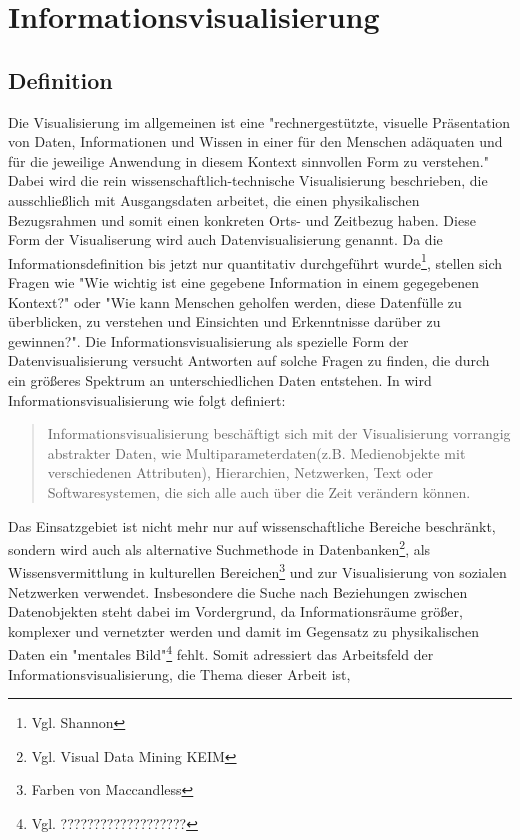 \documentclass[a4paper, 12pt, onepage, pdftex, headsepline, footsepline]{scrreprt}
\begin{document}
\chapter{Informationsvisualisierung}

\section{Definition}
Die Visualisierung im allgemeinen ist eine "rechnergestützte, visuelle Präsentation von Daten, Informationen und Wissen
in einer für den Menschen adäquaten und für die jeweilige Anwendung in diesem Kontext sinnvollen Form
zu verstehen."\citep[S.\,3]{Schumann}
Dabei wird die rein wissenschaftlich-technische Visualisierung beschrieben, die ausschließlich mit Ausgangsdaten arbeitet,
die einen physikalischen Bezugsrahmen und somit einen konkreten Orts- und Zeitbezug haben. Diese Form der
Visualiserung wird auch Datenvisualisierung genannt.
Da die Informationsdefinition bis jetzt nur quantitativ durchgeführt wurde\footnote{Vgl. Shannon}, stellen sich 
Fragen wie "Wie wichtig ist eine gegebene Information in einem gegegebenen Kontext?"\citep[S.\,341]{Schumann}
oder "Wie kann Menschen geholfen werden, diese Datenfülle zu überblicken, zu verstehen und Einsichten und Erkenntnisse
darüber zu gewinnen?"\citep[S.\,435]{Preim}.
Die Informationsvisualisierung als spezielle Form der Datenvisualisierung versucht Antworten auf solche
Fragen zu finden, die durch ein größeres Spektrum an unterschiedlichen Daten entstehen.
In \citep[S.\,434]{Preim} wird Informationsvisualisierung wie folgt definiert:
\begin{quote}
Informationsvisualisierung beschäftigt sich mit der Visualisierung vorrangig abstrakter Daten, wie
Multiparameterdaten(z.B. Medienobjekte mit verschiedenen Attributen), Hierarchien, Netzwerken, Text
oder Softwaresystemen, die sich alle auch über die Zeit verändern können.
\end{quote}
Das Einsatzgebiet ist nicht mehr nur auf wissenschaftliche Bereiche beschränkt,
sondern wird auch als alternative Suchmethode in Datenbanken\footnote{Vgl. Visual Data Mining KEIM},
als Wissensvermittlung in kulturellen Bereichen\footnote{Farben von Maccandless} und zur Visualisierung von
sozialen Netzwerken verwendet.
Insbesondere die Suche nach Beziehungen zwischen Datenobjekten steht dabei im Vordergrund,
da Informationsräume größer, komplexer und vernetzter werden und damit im Gegensatz
zu physikalischen Daten ein "mentales Bild"\footnote{Vgl. ???????????????????} fehlt.
Somit adressiert das Arbeitsfeld der Informationsvisualisierung, die Thema dieser Arbeit ist,
\end{document}
